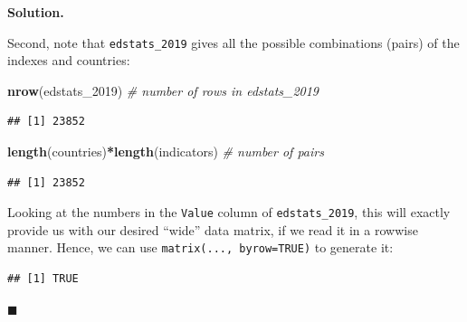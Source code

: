\documentclass[10pt,b5paper,krantz1]{krantz}
\newenvironment{Shaded}{\begin{snugshade}}{\end{snugshade}}
\newcommand{\CommentTok}[1]{\textcolor[rgb]{0.37,0.37,0.37}{\textit{#1}}}
\newcommand{\DataTypeTok}[1]{\textcolor[rgb]{0.27,0.27,0.27}{#1}}
\newcommand{\DecValTok}[1]{\textcolor[rgb]{0.06,0.06,0.06}{#1}}
\newcommand{\KeywordTok}[1]{\textcolor[rgb]{0.27,0.27,0.27}{\textbf{#1}}}
\newcommand{\NormalTok}[1]{#1}
\newcommand{\OperatorTok}[1]{\textcolor[rgb]{0.43,0.43,0.43}{\textbf{#1}}}
\newcommand{\OtherTok}[1]{\textcolor[rgb]{0.37,0.37,0.37}{#1}}
\newcommand{\StringTok}[1]{\textcolor[rgb]{0.5,0.5,0.5}{#1}}
\newenvironment{solution}{%
\bigskip\noindent\textbf{Solution. }%
\it\ignorespaces%
\ignorespaces%
}{\ignorespaces%
\hfill$\blacksquare$%
}
\begin{document}
\begin{solution}
Second, note that \texttt{edstats\_2019} gives all the possible combinations (pairs)
of the indexes and countries:

\begin{Shaded}
\begin{Highlighting}[]
\KeywordTok{nrow}\NormalTok{(edstats_}\DecValTok{2019}\NormalTok{) }\CommentTok{# number of rows in edstats_2019}
\end{Highlighting}
\end{Shaded}

\begin{verbatim}
## [1] 23852
\end{verbatim}

\begin{Shaded}
\begin{Highlighting}[]
\KeywordTok{length}\NormalTok{(countries)}\OperatorTok{*}\KeywordTok{length}\NormalTok{(indicators) }\CommentTok{# number of pairs}
\end{Highlighting}
\end{Shaded}

\begin{verbatim}
## [1] 23852
\end{verbatim}

Looking at the numbers in the \texttt{Value} column of \texttt{edstats\_2019},
this will exactly provide us with our desired ``wide'' data matrix,
if we read it in a rowwise manner. Hence, we can use
\texttt{matrix(...,\ byrow=TRUE)} to generate it:

\begin{Shaded}
\end{Shaded}

\begin{verbatim}
## [1] TRUE
\end{verbatim}

\end{solution}
\end{document}
